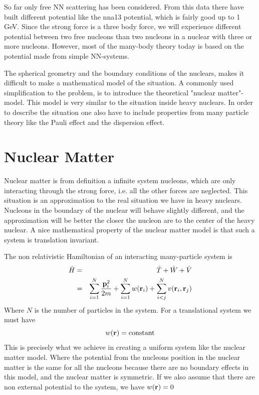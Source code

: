 \label{chap:In-Medium Scattering} 
So far only free NN scattering has been considered. From this data there have built different potential
like the nna13 potential, which is fairly good up to 1 GeV. Since the strong force is a three body force, we will
experience different potential between two free nucleons than two nucleons in a nuclear with three or more nucleons. 
However, most of the many-body theory today is based on the potential made from simple NN-systems.

The spherical geometry and the boundary conditions 
of the nuclears, makes it difficult to make a mathematical model of the situation. A commonly used 
simplification to the problem, is to introduce
the theoretical "nuclear matter"-model. This model is very similar to the situation inside heavy nuclears.
In order to describe the situation one also have to include properties from many particle theory 
like the Pauli effect and the dispersion effect.
\section{Nuclear Matter}
Nuclear matter is from definition  a infinite system nucleons, which are only interacting through the strong force,
i.e. all the other forces are neglected. This situation is an approximation to the real situation we
have in heavy nuclears. Nucleons in the boundary of the nuclear will behave slightly different, 
and the approximation will be better the closer the nucleon are to the center of the heavy nuclear.
A nice mathematical property of the nuclear matter model is that such a system is translation invariant.

The non relativistic Hamiltonian of an interacting many-particle system is
\begin{eqnarray}\label{eq:first-quant}
\op{H}&=&\op{T}+\op{W}+\op{V}\nonumber\\
      &=&\sum^N_{i=1}\frac{{{{\bf p}}}^2_i}{2m}+\sum^N_{i=1}w({{\bf r}}_i)+\sum^N_{i<j}v({{\bf r}}_i,{{\bf r}}_j)
\end{eqnarray}
Where $N$ is the number of particles in the system. For a translational system we must have
\begin{equation}
w({{\bf r}})={\text{constant}}
\end{equation}
This is precisely what we achieve in creating a uniform system like the nuclear matter model. Where the
potential from the nucleons position in the nuclear matter is the same for all the nucleons because there are no boundary effects 
in this model, and the nuclear matter is symmetric. If we also assume that there are non external potential to the system,
we have $w({{\bf r}})=0$

